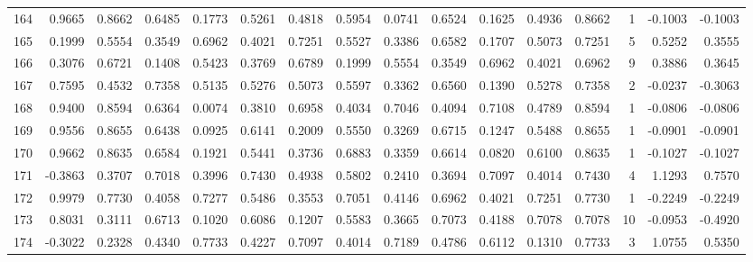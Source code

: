 \begin{tabular}{lrrrrrrrrrrrrrrr}
164 &      0.9665 &  0.8662 &  0.6485 &  0.1773 &  0.5261 &  0.4818 &  0.5954 &  0.0741 &  0.6524 &  0.1625 &   0.4936 &     0.8662 &      1 &                   -0.1003 &                    -0.1003 \\
165 &      0.1999 &  0.5554 &  0.3549 &  0.6962 &  0.4021 &  0.7251 &  0.5527 &  0.3386 &  0.6582 &  0.1707 &   0.5073 &     0.7251 &      5 &                    0.5252 &                     0.3555 \\
166 &      0.3076 &  0.6721 &  0.1408 &  0.5423 &  0.3769 &  0.6789 &  0.1999 &  0.5554 &  0.3549 &  0.6962 &   0.4021 &     0.6962 &      9 &                    0.3886 &                     0.3645 \\
167 &      0.7595 &  0.4532 &  0.7358 &  0.5135 &  0.5276 &  0.5073 &  0.5597 &  0.3362 &  0.6560 &  0.1390 &   0.5278 &     0.7358 &      2 &                   -0.0237 &                    -0.3063 \\
168 &      0.9400 &  0.8594 &  0.6364 &  0.0074 &  0.3810 &  0.6958 &  0.4034 &  0.7046 &  0.4094 &  0.7108 &   0.4789 &     0.8594 &      1 &                   -0.0806 &                    -0.0806 \\
169 &      0.9556 &  0.8655 &  0.6438 &  0.0925 &  0.6141 &  0.2009 &  0.5550 &  0.3269 &  0.6715 &  0.1247 &   0.5488 &     0.8655 &      1 &                   -0.0901 &                    -0.0901 \\
170 &      0.9662 &  0.8635 &  0.6584 &  0.1921 &  0.5441 &  0.3736 &  0.6883 &  0.3359 &  0.6614 &  0.0820 &   0.6100 &     0.8635 &      1 &                   -0.1027 &                    -0.1027 \\
171 &     -0.3863 &  0.3707 &  0.7018 &  0.3996 &  0.7430 &  0.4938 &  0.5802 &  0.2410 &  0.3694 &  0.7097 &   0.4014 &     0.7430 &      4 &                    1.1293 &                     0.7570 \\
172 &      0.9979 &  0.7730 &  0.4058 &  0.7277 &  0.5486 &  0.3553 &  0.7051 &  0.4146 &  0.6962 &  0.4021 &   0.7251 &     0.7730 &      1 &                   -0.2249 &                    -0.2249 \\
173 &      0.8031 &  0.3111 &  0.6713 &  0.1020 &  0.6086 &  0.1207 &  0.5583 &  0.3665 &  0.7073 &  0.4188 &   0.7078 &     0.7078 &     10 &                   -0.0953 &                    -0.4920 \\
174 &     -0.3022 &  0.2328 &  0.4340 &  0.7733 &  0.4227 &  0.7097 &  0.4014 &  0.7189 &  0.4786 &  0.6112 &   0.1310 &     0.7733 &      3 &                    1.0755 &                     0.5350 \\

\end{tabular}
